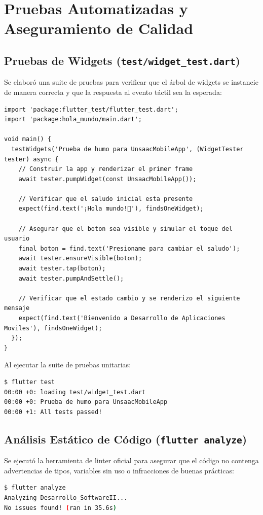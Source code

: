 \documentclass[12pt,a4paper]{article}
\begin{document}
\section{Pruebas Automatizadas y Aseguramiento de Calidad}

\subsection{Pruebas de Widgets (\texttt{test/widget\_test.dart})}
Se elaboró una suite de pruebas para verificar que el árbol de widgets se instancie de manera correcta y que la respuesta al evento táctil sea la esperada:

\begin{lstlisting}
import 'package:flutter_test/flutter_test.dart';
import 'package:hola_mundo/main.dart';

void main() {
  testWidgets('Prueba de humo para UnsaacMobileApp', (WidgetTester tester) async {
    // Construir la app y renderizar el primer frame
    await tester.pumpWidget(const UnsaacMobileApp());

    // Verificar que el saludo inicial esta presente
    expect(find.text('¡Hola mundo!📱'), findsOneWidget);

    // Asegurar que el boton sea visible y simular el toque del usuario
    final boton = find.text('Presioname para cambiar el saludo');
    await tester.ensureVisible(boton);
    await tester.tap(boton);
    await tester.pumpAndSettle();

    // Verificar que el estado cambio y se renderizo el siguiente mensaje
    expect(find.text('Bienvenido a Desarrollo de Aplicaciones Moviles'), findsOneWidget);
  });
}
\end{lstlisting}

Al ejecutar la suite de pruebas unitarias:
\begin{lstlisting}[language=bash, numbers=none]
$ flutter test
00:00 +0: loading test/widget_test.dart
00:00 +0: Prueba de humo para UnsaacMobileApp
00:00 +1: All tests passed!
\end{lstlisting}

\subsection{Análisis Estático de Código (\texttt{flutter analyze})}
Se ejecutó la herramienta de linter oficial para asegurar que el código no contenga advertencias de tipos, variables sin uso o infracciones de buenas prácticas:
\begin{lstlisting}[language=bash, numbers=none]
$ flutter analyze
Analyzing Desarrollo_SoftwareII...                              
No issues found! (ran in 35.6s)
\end{lstlisting}
\end{document}
